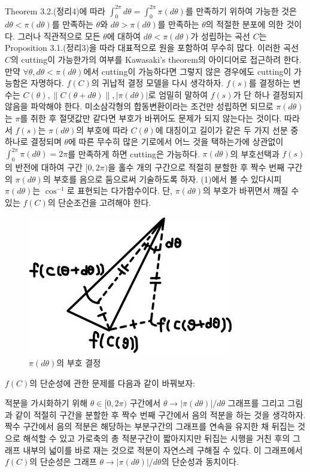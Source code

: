 \documentclass[11pt]{article}
\begin{document}
Theorem 3.2.(정리4)에 따라 $\int _0 ^{2\pi} d \theta=\int _0 ^{2\pi} \pi(d \theta)$를 만족하기 위하여 가능한 것은 $d\theta<\pi(d\theta)$를 만족하는 $\theta$와 $d\theta>\pi(d\theta)$를 만족하는 $\theta$의 적절한 분포에 의한 것이다. 그러나 직관적으로 모든 $\theta$에 대하여 $d\theta<\pi(d\theta)$가 성립하는 곡선 $C$는 Proposition 3.1.(정리3)을 따라 대표적으로 원을 포함하여 무수히 많다. 이러한 곡선 $C$의 cutting이 가능한가의 여부를 Kawasaki's theorem의 아이디어로 접근하려 한다. 만약 $\forall \theta, d\theta<\pi(d\theta)$에서 cutting이 가능하다면 그렇지 않은 경우에도 cutting이 가능함은 자명하다.
$f(C)$의 귀납적 결정 모델을 다시 생각하자. $f(s)$를 결정하는 변수는 $C(\theta), \|C(\theta+d\theta)\|, |\pi(d\theta)|$로 엄밀히 말하여 $f(s)$가 단 하나 결정되지 않음을 파악해야 한다. 미소삼각형의 합동변환이라는 조건만 성립하면 되므로 $\pi(d\theta)$는 $\pi$를 취한 후 절댓값만 같다면 부호가 바뀌어도 문제가 되지 않는다는 것이다. 따라서 $f(s)$는 $\pi(d\theta)$의 부호에 따라 $C(\theta)$에 대칭이고 길이가 같은 두 가지 선분 중 하나로 결정되며 $\theta$에 따른 무수히 많은 기로에서 어느 것을 택하는가에 상관없이 $\int_0^{2\pi} \pi(d\theta)=2\pi$를 만족하게 하면 cutting은 가능하다. $\pi(d\theta)$의 부호선택과 $f(s)$의 반전에 대하여 구간 $[0,2\pi)$을 홀수 개의 구간으로 적절히 분할한 후 짝수 번째 구간의 $\pi(d\theta)$의 부호를 음으로 둠으로써 기술하도록 하자. (1)에서 볼 수 있다시피 $\pi(d\theta)$는 $\cos^{-1}$로 표현되는 다가함수이다. 단, $\pi(d\theta)$의 부호가 바뀌면서 깨질 수 있는 $f(C)$의 단순조건을 고려해야 한다.


\begin{figure}
\centering
\includegraphics{9.png}
\caption{$\pi(d\theta)$의 부호 결정}
\end{figure}


$f(C)$의 단순성에 관한 문제를 다음과 같이 바꿔보자:


적분을 가시화하기 위해 $\theta \in [0,2\pi)$ 구간에서 $\theta \to |\pi(d\theta)|/d\theta$ 그래프를 그리고 그림과 같이 적절히 구간을 분할한 후 짝수 번째 구간에서 음의 적분을 하는 것을 생각하자. 짝수 구간에서 음의 적분은 해당하는 부분구간의 그래프를 연속을 유지한 채 뒤집는 것으로 해석할 수 있고 가로축의 총 적분구간이 짧아지지만 뒤집는 시행을 거친 후의 그래프 내부의 넓이를 바로 재는 것으로 적분이 자연스레 구해질 수 있다. 이 그래프에서 $f(C)$의 단순성은 그래프 $\theta \to |\pi(d\theta)|/d\theta$의 단순성과 동치이다.
\end{document}
